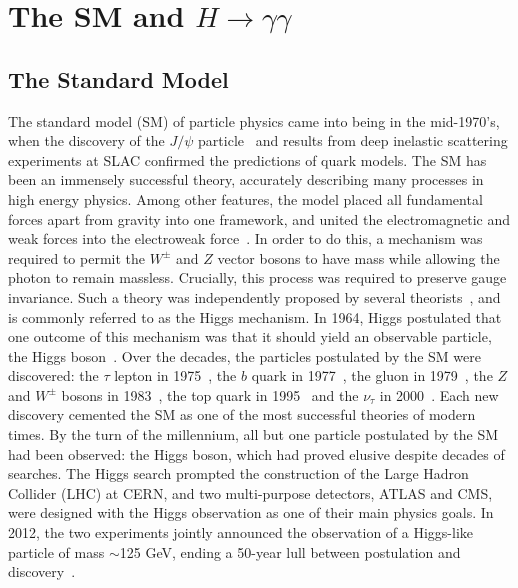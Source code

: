 \documentclass[10pt]{article}
\begin{document}
\section{The SM and $H \rightarrow \gamma \gamma$}

\subsection{The Standard Model}


The standard model (SM) of particle physics came into being in the mid-1970's, when the discovery of the $J / \psi$ particle~\cite{RichterPsi,TingJ} and results from deep inelastic scattering experiments at SLAC confirmed the predictions of quark models. The SM has been an immensely successful theory, accurately describing many processes in high energy physics. Among other features, the model placed all fundamental forces apart from gravity into one framework, and united the electromagnetic and weak forces into the electroweak force~\cite{GIM,Salam,Weinberg}. In order to do this, a mechanism was required to permit the $W^{\pm}$ and $Z$ vector bosons to have mass while allowing the photon to remain massless. Crucially, this process was required to preserve gauge invariance. Such a theory was independently proposed by several theorists~\cite{BroutEnglert,Higgs1,Higgs2,Kibble1,Higgs3,Kibble2}, and is commonly referred to as the Higgs mechanism. In 1964, Higgs postulated that one outcome of this mechanism was that it should yield an observable particle, the Higgs boson~\cite{Higgs2}. Over the decades, the particles postulated by the SM were discovered: the $\tau$ lepton in 1975~\cite{tauDisc}, the $b$ quark in 1977~\cite{bquarkDisc}, the gluon in 1979~\cite{Gluon1,Gluon2,Gluon3}, the $Z$ and $W^{\pm}$ bosons in 1983~\cite{ZDisc,WDisc}, the top quark in 1995~\cite{tquarkDisc1,tquarkDisc2} and the $\nu_{\tau}$ in 2000~\cite{TauNuDisc}. Each new discovery cemented the SM as one of the most successful theories of modern times. By the turn of the millennium, all but one particle postulated by the SM had been observed: the Higgs boson, which had proved elusive despite decades of searches. The Higgs search prompted the construction of the Large Hadron Collider (LHC) at CERN, and two multi-purpose detectors, ATLAS and CMS, were designed with the Higgs observation as one of their main physics goals. In 2012, the two experiments jointly announced the observation of a Higgs-like particle of mass $\sim$125 GeV, ending a 50-year lull between postulation and discovery~\cite{CMSHDisc,ATLASHDisc}.
\end{document}
